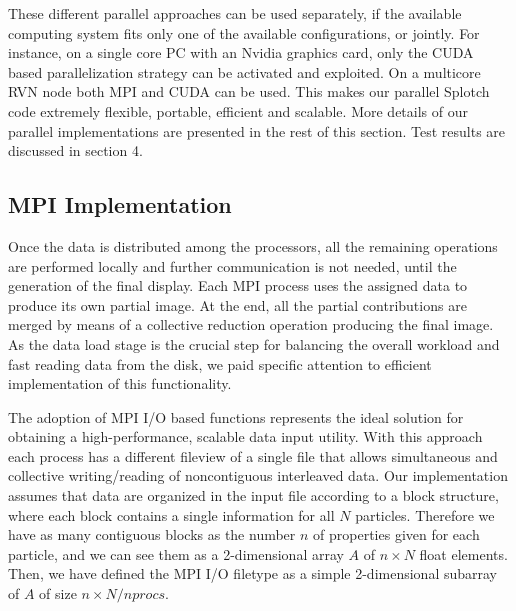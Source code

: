 \documentclass[1p,times]{elsarticle}
\begin{document}
These different parallel approaches can be used separately, 
if the available computing system fits only one of the available configurations, or jointly. 
For instance, on a single core PC with an Nvidia graphics card, only the CUDA based
parallelization strategy can be activated and exploited. On a multicore RVN  
node both MPI and CUDA can be used. This makes our parallel Splotch code 
extremely flexible, portable, efficient and scalable. More details of our parallel implementations are presented in the rest of this section. Test results are discussed in section 4.

\subsection{MPI Implementation}
\label{mpi}

Once the data is distributed among the processors, all the remaining operations 
are performed locally and further communication is not needed, until the generation
of the final display. Each MPI process uses the assigned 
data to produce its own partial image. At the end, all the partial contributions are merged by means of a
collective reduction operation producing the final image. As the data load stage is the crucial step for balancing the overall workload and fast reading
data from the disk, we paid specific attention to efficient implementation of this functionality.

The adoption of MPI I/O based functions represents the ideal solution for obtaining
a high-performance, scalable data input utility.
With this approach each process has a different fileview of a single file 
that allows simultaneous and collective
writing/reading of noncontiguous interleaved data. 
Our implementation assumes that data are organized in the input file according to a block structure, 
where each block contains a single information for 
all $N$ particles. Therefore we have as many contiguous blocks
as the number $n$ of properties given for each particle, and we can see them as a 2-dimensional array $A$ 
of $n \times N$ float elements. 
Then, we have defined the MPI I/O filetype as a simple 2-dimensional subarray of $A$ 
of size $n \times N/nprocs$.
\end{document}
